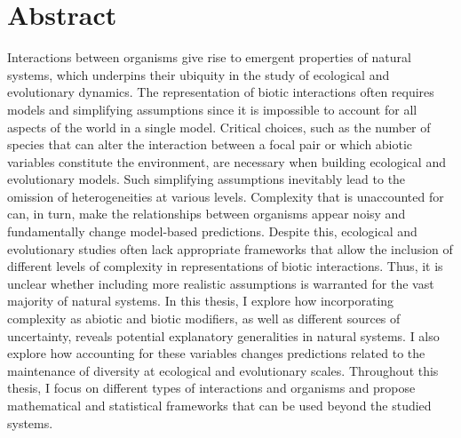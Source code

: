 \chapter*{Abstract}
\small
Interactions between organisms give rise to emergent properties of natural systems, which underpins their ubiquity in the study of ecological and evolutionary dynamics. The representation of biotic interactions often requires models and simplifying assumptions since it is impossible to account for all aspects of the world in a single model. Critical choices, such as the number of species that can alter the interaction between a focal pair or which abiotic variables constitute the environment, are necessary when building ecological and evolutionary models. Such simplifying assumptions inevitably lead to the omission of heterogeneities at various levels. Complexity that is unaccounted for can, in turn, make the relationships between organisms appear noisy and fundamentally change model-based predictions. Despite this, ecological and evolutionary studies often lack appropriate frameworks that allow the inclusion of different levels of complexity in representations of biotic interactions. Thus, it is unclear whether including more realistic assumptions is warranted for the vast majority of natural systems. In this thesis, I explore how incorporating complexity as abiotic and biotic modifiers, as well as different sources of uncertainty, reveals potential explanatory generalities in natural systems. I also explore how accounting for these variables changes predictions related to the maintenance of diversity at ecological and evolutionary scales. Throughout this thesis, I focus on different types of interactions and organisms and propose mathematical and statistical frameworks that can be used beyond the studied systems.


